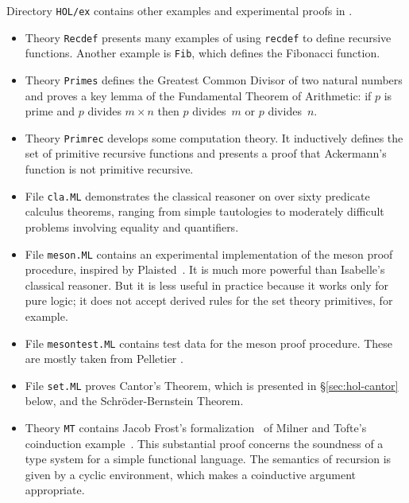 Directory \texttt{HOL/ex} contains other examples and experimental proofs in
{\HOL}.  
\begin{itemize}
\item Theory \texttt{Recdef} presents many examples of using \texttt{recdef}
  to define recursive functions.  Another example is \texttt{Fib}, which
  defines the Fibonacci function.

\item Theory \texttt{Primes} defines the Greatest Common Divisor of two
  natural numbers and proves a key lemma of the Fundamental Theorem of
  Arithmetic: if $p$ is prime and $p$ divides $m\times n$ then $p$ divides~$m$
  or $p$ divides~$n$.

\item Theory \texttt{Primrec} develops some computation theory.  It
  inductively defines the set of primitive recursive functions and presents a
  proof that Ackermann's function is not primitive recursive.

\item File \texttt{cla.ML} demonstrates the classical reasoner on over sixty
  predicate calculus theorems, ranging from simple tautologies to
  moderately difficult problems involving equality and quantifiers.

\item File \texttt{meson.ML} contains an experimental implementation of the {\sc
    meson} proof procedure, inspired by Plaisted~\cite{plaisted90}.  It is
  much more powerful than Isabelle's classical reasoner.  But it is less
  useful in practice because it works only for pure logic; it does not
  accept derived rules for the set theory primitives, for example.

\item File \texttt{mesontest.ML} contains test data for the {\sc meson} proof
  procedure.  These are mostly taken from Pelletier \cite{pelletier86}.

\item File \texttt{set.ML} proves Cantor's Theorem, which is presented in
  \S\ref{sec:hol-cantor} below, and the Schr\"oder-Bernstein Theorem.

\item Theory \texttt{MT} contains Jacob Frost's formalization~\cite{frost93} of
  Milner and Tofte's coinduction example~\cite{milner-coind}.  This
  substantial proof concerns the soundness of a type system for a simple
  functional language.  The semantics of recursion is given by a cyclic
  environment, which makes a coinductive argument appropriate.
\end{itemize}


